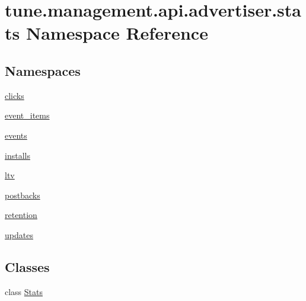 \hypertarget{namespacetune_1_1management_1_1api_1_1advertiser_1_1stats}{\section{tune.\-management.\-api.\-advertiser.\-stats Namespace Reference}
\label{namespacetune_1_1management_1_1api_1_1advertiser_1_1stats}
}
\subsection*{Namespaces}
\begin{DoxyCompactItemize}
\item 
\hyperlink{namespacetune_1_1management_1_1api_1_1advertiser_1_1stats_1_1clicks}{clicks}
\item 
\hyperlink{namespacetune_1_1management_1_1api_1_1advertiser_1_1stats_1_1event__items}{event\-\_\-items}
\item 
\hyperlink{namespacetune_1_1management_1_1api_1_1advertiser_1_1stats_1_1events}{events}
\item 
\hyperlink{namespacetune_1_1management_1_1api_1_1advertiser_1_1stats_1_1installs}{installs}
\item 
\hyperlink{namespacetune_1_1management_1_1api_1_1advertiser_1_1stats_1_1ltv}{ltv}
\item 
\hyperlink{namespacetune_1_1management_1_1api_1_1advertiser_1_1stats_1_1postbacks}{postbacks}
\item 
\hyperlink{namespacetune_1_1management_1_1api_1_1advertiser_1_1stats_1_1retention}{retention}
\item 
\hyperlink{namespacetune_1_1management_1_1api_1_1advertiser_1_1stats_1_1updates}{updates}
\end{DoxyCompactItemize}
\subsection*{Classes}
\begin{DoxyCompactItemize}
\item 
class \hyperlink{classtune_1_1management_1_1api_1_1advertiser_1_1stats_1_1Stats}{Stats}
\end{DoxyCompactItemize}
